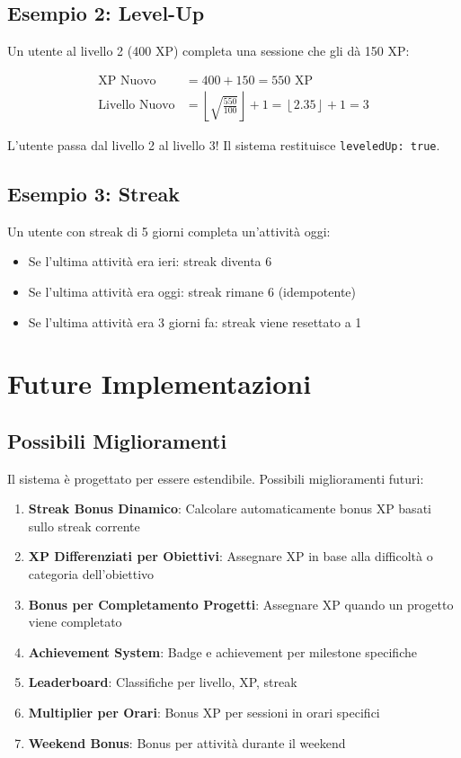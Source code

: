 \documentclass[11pt,a4paper]{article}
\begin{document}
\subsection{Esempio 2: Level-Up}

Un utente al livello 2 (400 XP) completa una sessione che gli dà 150 XP:

\begin{align}
\text{XP Nuovo} &= 400 + 150 = 550 \text{ XP} \\
\text{Livello Nuovo} &= \left\lfloor \sqrt{\frac{550}{100}} \right\rfloor + 1 = \left\lfloor 2.35 \right\rfloor + 1 = 3
\end{align}

L'utente passa dal livello 2 al livello 3! Il sistema restituisce \texttt{leveledUp: true}.

\subsection{Esempio 3: Streak}

Un utente con streak di 5 giorni completa un'attività oggi:

\begin{itemize}
    \item Se l'ultima attività era ieri: streak diventa 6
    \item Se l'ultima attività era oggi: streak rimane 6 (idempotente)
    \item Se l'ultima attività era 3 giorni fa: streak viene resettato a 1
\end{itemize}

\section{Future Implementazioni}

\subsection{Possibili Miglioramenti}

Il sistema è progettato per essere estendibile. Possibili miglioramenti futuri:

\begin{enumerate}
    \item \textbf{Streak Bonus Dinamico}: Calcolare automaticamente bonus XP basati sullo streak corrente
    \item \textbf{XP Differenziati per Obiettivi}: Assegnare XP in base alla difficoltà o categoria dell'obiettivo
    \item \textbf{Bonus per Completamento Progetti}: Assegnare XP quando un progetto viene completato
    \item \textbf{Achievement System}: Badge e achievement per milestone specifiche
    \item \textbf{Leaderboard}: Classifiche per livello, XP, streak
    \item \textbf{Multiplier per Orari}: Bonus XP per sessioni in orari specifici
    \item \textbf{Weekend Bonus}: Bonus per attività durante il weekend
\end{enumerate}
\end{document}
